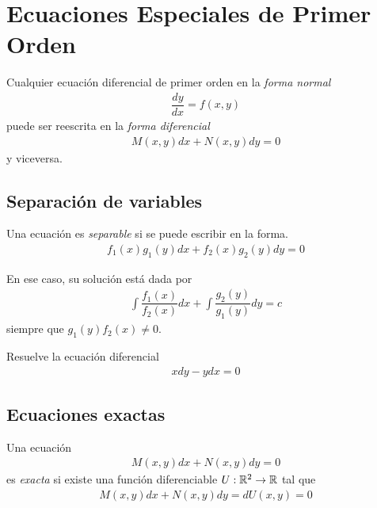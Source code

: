 \section{Ecuaciones Especiales de Primer Orden}


  Cualquier ecuación diferencial de primer orden en la \emph{forma normal}
     \begin{align*}
   \dfrac{dy}{dx} = f(x,y)
   \end{align*}
   puede ser reescrita en la \emph{forma diferencial}
       \begin{align*}
    M(x,y)dx+N(x,y)dy =0
    \end{align*}
    y  viceversa.

\subsection{Separación de variables}

Una ecuación es \emph{separable} si se puede escribir en la forma.
 \begin{align*}
 f_{1}(x)g_{1}(y)dx+f_{2}(x)g_{2}(y)dy = 0
 \end{align*}

{}
En ese caso, su solución  está dada por
   \begin{align*}
       \displaystyle \int \dfrac{f_{1}(x)}{f_{2}(x)}dx
       + \int \dfrac{g_{2}(y)}{g_{1}(y)}dy = c
  \end{align*}
  siempre que $g_{1}(y)f_{2}(x)\neq 0$.


	\begin{resuelto}
		Resuelve la ecuación diferencial
		\begin{align*}
		xdy-ydx=0
		\end{align*}
	\end{resuelto}

\subsection{Ecuaciones exactas}

  Una ecuación
     \begin{align*}
   M(x,y)dx + N(x,y)dy = 0
   \end{align*}
   es \emph{exacta} si
   existe una función diferenciable $U:\mathbb{R}^{2}\to \mathbb{R}$ tal que
       \begin{align*}
       M(x,y)dx + N(x,y)dy = dU(x,y) = 0
    \end{align*}


